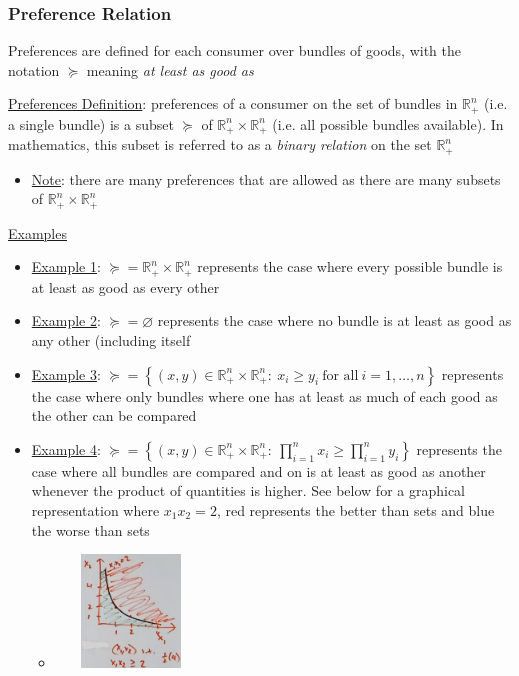 \documentclass{article}
\begin{document}
\subsubsection{Preference Relation}
Preferences are defined for each consumer over bundles of goods, with the notation $\succeq$ meaning \textit{at least as good as} \par \vspace{0.3em}
  \underline{Preferences Definition}: preferences of a consumer on the set of bundles in $\mathbb{R}_{+}^{n}$ (i.e. a single bundle) is a subset $\succeq$ of $\mathbb{R}_{+}^{n} \times \mathbb{R}_{+}^{n}$ (i.e. all possible bundles available). In mathematics, this subset is referred to as a \textit{binary relation} on the set $\mathbb{R}_{+}^{n}$
  \begin{itemize}
    \item  \underline{Note}: there are many preferences that are allowed as there are many subsets of $\mathbb{R}_{+}^{n} \times \mathbb{R}_{+}^{n}$
  \end{itemize}
  \par
  \underline{Examples}
  \begin{itemize}
    \item  \underline{Example 1}: $\succeq = \mathbb{R}_{+}^{n} \times \mathbb{R}_{+}^{n}$ represents the case where every possible bundle is at least as good as every other
    \item  \underline{Example 2}: $\succeq = \varnothing$ represents the case where no bundle is at least as good as any other (including itself
    \item  \underline{Example 3}: $\succeq = \left\{ (x,y) \in \mathbb{R}_{+}^{n} \times \mathbb{R}_{+}^{n}: \ x_{i} \geq y_{i} \ \text{for all} \ i = 1, \dots, n \right\}$ represents the case where only bundles where one has at least as much of each good as the other can be compared
    \item  \underline{Example 4}: $\succeq = \left\{ (x,y) \in \mathbb{R}_{+}^{n} \times \mathbb{R}_{+}^{n}: \ \prod_{i=1}^{n} x_{i} \geq \prod_{i=1}^{n} y_{i} \right\}$ represents the case where all bundles are compared and on is at least as good as another whenever the product of quantities is higher. See below for a graphical representation where $x_{1}x_{2} = 2$, red represents the better than sets and blue the worse than sets
    \begin{itemize}
      \item  \includegraphics[width=4cm, height=3cm]{pic12}
    \end{itemize}
  \end{itemize}
  \par
\vspace{6mm}
\end{document}
